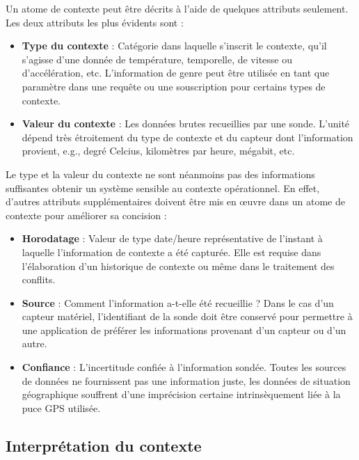 Un atome de contexte peut être décrits à l'aide de quelques attributs seulement.
Les deux attributs les plus évidents sont :

\begin{itemize}
    \item \textbf{Type du contexte} :
        Catégorie dans laquelle s'inscrit le contexte, qu'il s'agisse d'une
        donnée de température, temporelle, de vitesse ou d'accélération,
        etc. L'information de genre peut être utilisée en tant que paramètre
        dans une requête ou une souscription pour certains types de contexte. 
    \item \textbf{Valeur du contexte} : 
	    Les données brutes recueillies par une sonde. L'unité dépend très
	    étroitement du type de contexte et du capteur dont l'information
	    provient, e.g., degré Celcius, kilomètres par heure, mégabit, etc.
\end{itemize}

Le type et la valeur du contexte ne sont néanmoins pas des informations
suffisantes obtenir un système sensible au contexte opérationnel. En effet,
d'autres attributs supplémentaires doivent être mis en œuvre dans un atome de
contexte pour améliorer sa concision :

\begin{itemize}
    \item \textbf{Horodatage} :
        Valeur de type date/heure représentative de l'instant à laquelle
        l'information de contexte a été capturée. Elle est requise dans
        l'élaboration d'un historique de contexte ou même dans le traitement des
        conflits.
    \item \textbf{Source} :
        Comment l'information a-t-elle été recueillie ? Dans le cas d'un
        capteur matériel, l'identifiant de la sonde doit être conservé pour
        permettre à une application de préférer les informations provenant
        d'un capteur ou d'un autre.
    \item \textbf{Confiance} :
        L'incertitude confiée à l'information sondée. Toutes les sources
        de données ne fournissent pas une information juste, les données de
        situation géographique souffrent d'une imprécision certaine
        intrinsèquement liée à la puce GPS utilisée.
\end{itemize}

\subsection{Interprétation du contexte}

